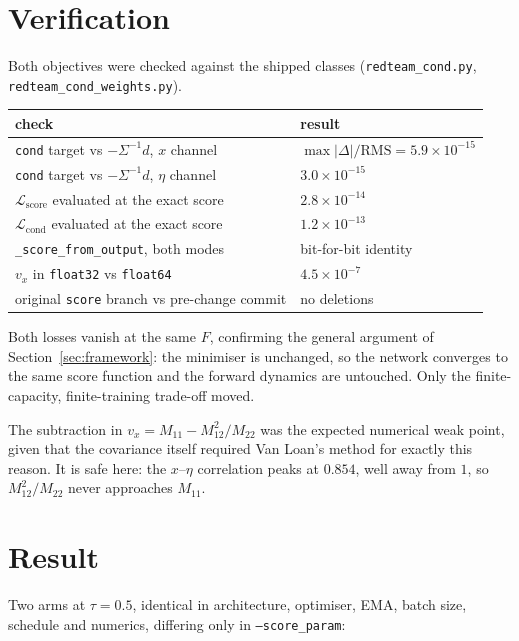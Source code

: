 \documentclass[11pt]{article}
\newcommand{\tauu}{\tau}
\begin{document}
\section{Verification}

\begin{sloppypar}
Both objectives were checked against the shipped classes
(\texttt{redteam\_cond.py}, \texttt{redteam\_cond\_weights.py}).
\end{sloppypar}

\begin{center}
\begin{tabular}{ll}
\toprule
check & result\\
\midrule
\texttt{cond} target vs $-\Sigma^{-1}d$, $x$ channel & $\max|\Delta|/\text{RMS} = 5.9\times10^{-15}$\\
\texttt{cond} target vs $-\Sigma^{-1}d$, $\eta$ channel & $3.0\times10^{-15}$\\
$\mathcal{L}_{\text{score}}$ evaluated at the exact score & $2.8\times10^{-14}$\\
$\mathcal{L}_{\text{cond}}$ evaluated at the exact score & $1.2\times10^{-13}$\\
\texttt{\_score\_from\_output}, both modes & bit-for-bit identity\\
$v_x$ in \texttt{float32} vs \texttt{float64} & $4.5\times10^{-7}$\\
original \texttt{score} branch vs pre-change commit & no deletions\\
\bottomrule
\end{tabular}
\end{center}

Both losses vanish at the same $F$, confirming the general argument of
Section~\ref{sec:framework}: the minimiser is unchanged, so the network converges to the same
score function and the forward dynamics are untouched. Only the finite-capacity,
finite-training trade-off moved.

The subtraction in $v_x = M_{11}-M_{12}^{2}/M_{22}$ was the expected numerical weak point,
given that the covariance itself required Van Loan's method for exactly this reason. It is
safe here: the $x$--$\eta$ correlation peaks at $0.854$, well away from $1$, so
$M_{12}^{2}/M_{22}$ never approaches $M_{11}$.

\section{Result}

Two arms at $\tauu=0.5$, identical in architecture, optimiser, EMA, batch size, schedule
and numerics, differing only in \texttt{--score\_param}:
\end{document}
